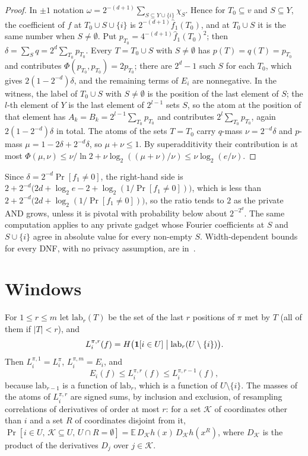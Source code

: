 \documentclass[11pt]{amsart}
\theoremstyle{remark}
\newcommand{\E}{\mathbb{E}}
\newcommand{\lab}{\mathrm{lab}}
\begin{document}
\begin{proof}
In $\pm1$ notation $\omega=2^{-(d+1)}\sum_{S\subseteq Y\cup\{i\}}\chi_S$. Hence for $T_0\subseteq v$ and $S\subseteq Y$, the
coefficient of $f$ at $T_0\cup S\cup\{i\}$ is $2^{-(d+1)}\hat f_1(T_0)$, and at $T_0\cup S$ it is the same number when
$S\ne\emptyset$. Put $p_{T_0}=4^{-(d+1)}\hat f_1(T_0)^2$; then $\delta=\sum_Sq=2^d\sum_{T_0}p_{T_0}$. Every $T=T_0\cup S$ with $S\ne\emptyset$
has $p(T)=q(T)=p_{T_0}$ and contributes $\Phi(p_{T_0},p_{T_0})=2p_{T_0}$; there are $2^d-1$ such $S$ for each $T_0$, which gives
$2(1-2^{-d})\delta$, and the remaining terms of $E_i$ are nonnegative. In the witness, the label of $T_0\cup S$ with
$S\ne\emptyset$ is the position of the last element of $S$; the $l$-th element of $Y$ is the last element of $2^{l-1}$
sets $S$, so the atom at the position of that element has $A_k=B_k=2^{l-1}\sum_{T_0}p_{T_0}$ and contributes $2^l\sum_{T_0}p_{T_0}$, again $2(1-2^{-d})\delta$ in total. The
atoms of the sets $T=T_0$ carry $q$-mass $\nu=2^{-d}\delta$ and $p$-mass $\mu=1-2\delta+2^{-d}\delta$, so $\mu+\nu\le1$. By
superadditivity their contribution is at most $\Phi(\mu,\nu)\le\nu/\ln2+\nu\log_2((\mu+\nu)/\nu)\le\nu\log_2(e/\nu)$.
\end{proof}

Since $\delta=2^{-d}\Pr[f_1\ne0]$, the right-hand side is $2+2^{-d}\bigl(2d+\log_2e-2+\log_2(1/\Pr[f_1\ne0])\bigr)$, which
is less than $2+2^{-d}\bigl(2d+\log_2(1/\Pr[f_1\ne0])\bigr)$, so
the ratio tends to $2$ as the private AND grows, unless it is pivotal with probability below about $2^{-2^d}$. The same
computation applies to any private gadget whose Fourier coefficients at $S$ and $S\cup\{i\}$ agree in absolute value for
every non-empty $S$. Width-dependent bounds for every DNF, with no privacy assumption, are in~\cite{Shm3}.

\section{Windows}\label{sec:windows}

For $1\le r\le m$ let $\lab_r(T)$ be the set of the last $r$ positions of $\pi$ met by $T$ (all of them if $|T|<r$), and
\[
L^{\pi,r}_i(f)=H\bigl(\mathbf 1[i\in U]\bigm|\lab_r(U\setminus\{i\})\bigr).
\]
Then $L^{\pi,1}_i=L^\pi_i$, $L^{\pi,m}_i=E_i$, and
\[
E_i(f)\le L^{\pi,r}_i(f)\le L^{\pi,r-1}_i(f),
\]
because $\lab_{r-1}$ is a function of $\lab_r$, which is a function of $U\setminus\{i\}$. The masses of the atoms of $L^{\pi,r}_i$
are signed sums, by inclusion and exclusion, of resampling correlations of derivatives of order at most $r$: for
a set $\mathcal K$ of coordinates other than $i$ and a set $R$ of coordinates disjoint from it,
$\Pr[i\in U,\,\mathcal K\subseteq U,\,U\cap R=\emptyset]=\E\,D_{\mathcal K}h(x)\,D_{\mathcal K}h(x^R)$, where $D_{\mathcal K}$ is the product of the derivatives $D_j$ over $j\in\mathcal K$.
\end{document}

